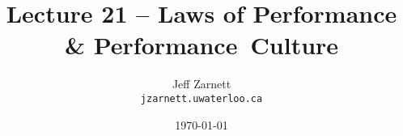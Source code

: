 

\title{Lecture 21 -- Laws of Performance \& Performance~Culture }

\author{Jeff Zarnett \\ \small \texttt{jzarnett.uwaterloo.ca}}
\date{\today}




\begin{frame}
  \titlepage

 \end{frame}






